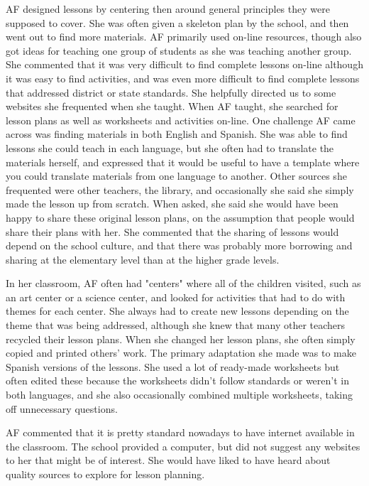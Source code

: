 \documentclass[12pt,titlepage]{article}
\begin{document}
AF designed lessons by centering then around general principles they were
supposed to cover.  She was often given a skeleton plan by the school, and then
went out to find more materials.  AF primarily used on-line resources, though
also got ideas for teaching one group of students as she was teaching another
group.  She commented that it was very difficult to find complete lessons on-line
although it was easy to find activities, and was even more difficult to find
complete lessons that addressed district or state standards.  She helpfully
directed us to some websites she frequented when she taught.  When AF taught,
she searched for lesson plans as well as worksheets and activities on-line. One
challenge AF came across was finding materials in both English and Spanish.  She
was able to find lessons she could teach in each language, but she often had to
translate the materials herself, and expressed that it would be useful to have a
template where you could translate materials from one language to another.
Other sources she frequented were other teachers, the library, and occasionally
she said she simply made the lesson up from scratch.  When asked, she said she
would have been happy to share these original lesson plans, on the assumption
that people would share their plans with her.  She commented that the sharing of
lessons would depend on the school culture, and that there was probably more
borrowing and sharing at the elementary level than at the higher grade levels.

In her classroom, AF often had "centers" where all of the children visited, such
as an art center or a science center, and looked for activities that had to do
with themes for each center.  She always had to create new lessons depending on
the theme that was being addressed, although she knew that many other teachers
recycled their lesson plans.  When she changed her lesson plans, she often
simply copied and printed others' work.  The primary adaptation she made was to
make Spanish versions of the lessons.  She used a lot of ready-made worksheets
but often edited these because the worksheets didn't follow standards or weren't
in both languages, and she also occasionally combined multiple worksheets,
taking off unnecessary questions.

AF commented that it is pretty standard nowadays to have internet available in
the classroom.  The school provided a computer, but did not suggest any websites
to her that might be of interest.  She would have liked to have heard about
quality sources to explore for lesson planning.
\end{document}
